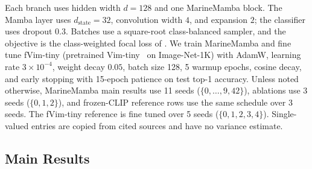 \documentclass[runningheads]{llncs}
\begin{document}
Each branch uses hidden width $d=128$ and one MarineMamba block. The Mamba layer uses $d_{\text{state}}=32$, convolution width $4$, and expansion $2$; the classifier uses dropout $0.3$. Batches use a square-root class-balanced sampler, and the objective is the class-weighted focal loss of . We train MarineMamba and fine tune fVim-tiny (pretrained Vim-tiny~\cite{zhu2024vim} on Image-Net-1K) with AdamW, learning rate $3\times10^{-4}$, weight decay $0.05$, batch size 128, 5 warmup epochs, cosine decay, and early stopping with 15-epoch patience on test top-1 accuracy. Unless noted otherwise, MarineMamba main results use 11 seeds ($\{0,\dots,9,42\}$), ablations use 3 seeds ($\{0,1,2\}$), and frozen-CLIP reference rows use the same schedule over 3 seeds. The fVim-tiny reference is fine tuned over 5 seeds ($\{0,1,2,3,4\}$). Single-valued entries are copied from cited sources and have no variance estimate.

\subsection{Main Results}
\label{sec:main-results}
\end{document}
